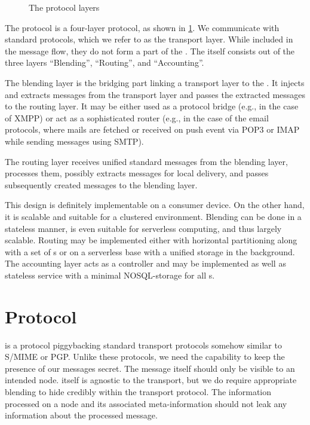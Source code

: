 \begin{figure}[ht]
	\resizebox{0.95\textwidth}{!}{}
	\caption{The protocol layers}
	\label{fig:protocolLayers}
\end{figure}

The protocol is a four-layer protocol, as shown in \cref{fig:protocolLayers}. We communicate with standard protocols, which we refer to as the transport layer. While included in the message flow, they do not form a part of the \VortexNode. The \VortexNode{} itself consists out of the three layers ``Blending'', ``Routing'', and ``Accounting''.

The blending layer is the bridging part linking a transport layer to the \VortexNode{}. It injects and extracts messages from the transport layer and passes the extracted messages to the routing layer. It may be either used as a protocol bridge (e.g., in the case of XMPP) or act as a sophisticated router (e.g., in the case of the email protocols, where mails are fetched or received on push event via POP3 or IMAP while sending messages using SMTP).

The routing layer receives unified standard messages from the blending layer, processes them, possibly extracts messages for local delivery, and passes subsequently created messages to the blending layer.

This design is definitely implementable on a consumer device. On the other hand, it is scalable and suitable for a clustered environment. Blending can be done in a stateless manner, is even suitable for serverless computing, and thus largely scalable. Routing may be implemented either with horizontal partitioning along with a set of s or on a serverless base with a unified storage in the background. The accounting layer acts as a controller and may be implemented as well as stateless service with a minimal NOSQL-storage for all s. 

\chapter{Protocol}\label{sec:protocol}
\MessageVortex{} is a protocol piggybacking standard transport protocols somehow similar to S/MIME\cite{rfc2015} or PGP\cite{PGP}. Unlike these protocols, we need the capability to keep the presence of our messages secret.  The message itself should only be visible to an intended node.\MessageVortex{} itself is agnostic to the transport, but we do require appropriate blending to hide credibly within the transport protocol. The information processed on a node and its associated meta-information should not leak any information about the processed message. 

